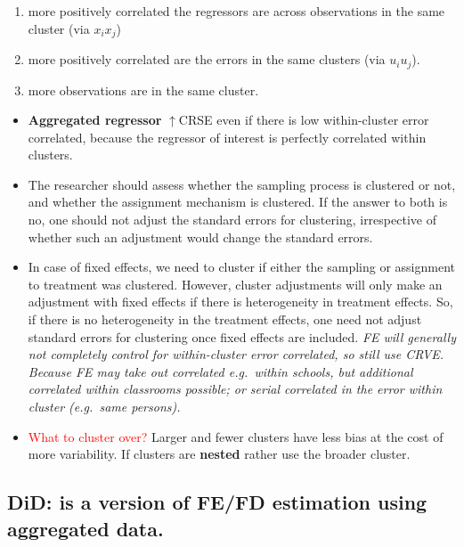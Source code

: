 \documentclass[
]{article}
\begin{document}
\begin{enumerate}
\def\labelenumi{\arabic{enumi}.}
\item
  more positively correlated the regressors are across observations in
  the same cluster (via \(x_i x_j\))
\item
  more positively correlated are the errors in the same clusters (via
  \(u_iu_j\)).
\item
  more observations are in the same cluster.
\end{enumerate}

\begin{itemize}
\item
  \textbf{Aggregated regressor} \(\uparrow\)CRSE even if there is low
  within-cluster error correlated, because the regressor of interest is
  perfectly correlated within clusters.
\item
  The researcher should assess whether the sampling process is clustered
  or not, and whether the assignment mechanism is clustered. If the
  answer to both is no, one should not adjust the standard errors for
  clustering, irrespective of whether such an adjustment would change
  the standard errors.
\item
  In case of fixed effects, we need to cluster if either the sampling or
  assignment to treatment was clustered. However, cluster adjustments
  will only make an adjustment with fixed effects if there is
  heterogeneity in treatment effects. So, if there is no heterogeneity
  in the treatment effects, one need not adjust standard errors for
  clustering once fixed effects are included. \emph{FE will generally
  not completely control for within-cluster error correlated, so still
  use CRVE. Because FE may take out correlated e.g.~within schools, but
  additional correlated within classrooms possible; or serial correlated
  in the error within cluster (e.g.~same persons).}
\item
  \textcolor{red}{What to cluster over?} Larger and fewer clusters have
  less bias at the cost of more variability. If clusters are
  \textbf{nested} rather use the broader cluster.
\end{itemize}

\hypertarget{did-is-a-version-of-fefd-estimation-using-aggregated-data.}{%
\subsection{DiD: is a version of FE/FD estimation using aggregated
data.}\label{did-is-a-version-of-fefd-estimation-using-aggregated-data.}}
\end{document}
